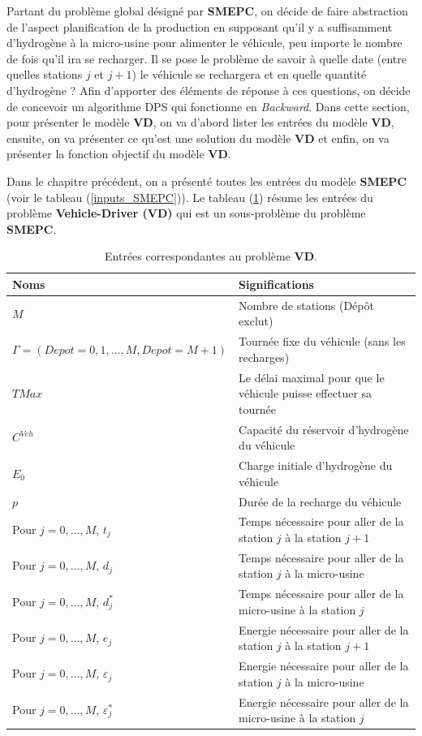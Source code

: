 Partant du problème global désigné par \textbf{SMEPC}, on décide de faire abstraction de l'aspect planification de la production en supposant qu'il y a suffisamment d'hydrogène à la micro-usine pour alimenter le véhicule, peu importe le nombre de fois qu'il ira se recharger. Il se pose le problème de savoir à quelle date (entre quelles stations $j$ et $j+1$) le véhicule se rechargera et en quelle quantité d'hydrogène ? Afin d'apporter des éléments de réponse à ces questions, on décide de concevoir un algorithme DPS qui fonctionne en \textit{Backward}. Dans cette section, pour présenter le modèle \textbf{VD}, on va d'abord lister les entrées du modèle \textbf{VD}, ensuite, on va présenter ce qu'est une solution du modèle \textbf{VD} et enfin, on va présenter la fonction objectif du modèle \textbf{VD}.

Dans le chapitre précédent, on a présenté toutes les entrées du modèle \textbf{SMEPC} (voir le tableau (\ref{inputs_SMEPC})). Le tableau (\ref{inputs_pb_recharge}) résume les entrées du problème \textbf{Vehicle-Driver (VD)} qui est un sous-problème du problème \textbf{SMEPC}. 

\begin{table}[H]
	\centering
	\begin{tabular}{|*{2}{m{8cm}|}}
		\hline
	\rowcolor{cyan}	Noms & Significations\\
		\hline
		$M$  & Nombre de stations (Dépôt exclut)   \\
		\hline
		$\Gamma=(Depot=0, 1, \dots, M, Depot=M+1)$  & Tournée fixe du véhicule (sans les recharges)  \\
		\hline
		$TMax$  & Le délai maximal pour que le véhicule puisse effectuer sa tournée \\
		\hline
		$C^{Veh}$  & Capacité du réservoir d'hydrogène du véhicule   \\
		\hline
		$E_0$  & Charge initiale d'hydrogène du véhicule \\
		\hline
		$p$  & Durée de la recharge du véhicule \\
		\hline
		Pour $j=0, \dots, M$, $ t_j$ & Temps nécessaire pour aller de la station $j$ à la station $j + 1$ \\
		\hline
		Pour $j=0, \dots, M$, $ d_j$ & Temps nécessaire pour aller de la station $j$ à la micro-usine  \\
		\hline
		Pour $j=0, \dots, M $, $d_j^*$  & Temps nécessaire pour aller de la micro-usine à la station $j$    \\
		\hline
		Pour $j=0, \dots, M $, $e_j$ & Energie nécessaire pour aller de la station $j$ à la station $j + 1$ \\
		\hline
		Pour $j=0, \dots, M $, $\varepsilon_j$ & Energie nécessaire pour aller de la station $j$ à la micro-usine \\
		\hline
		Pour $j=0, \dots, M $, $\varepsilon_j^*$ & Energie nécessaire pour aller de la micro-usine à la station $j $  \\
		\hline
	\end{tabular}
	\caption[Entrées du problème VD]{Entrées correspondantes au problème \textbf{VD}. \label{inputs_pb_recharge}}
\end{table}

